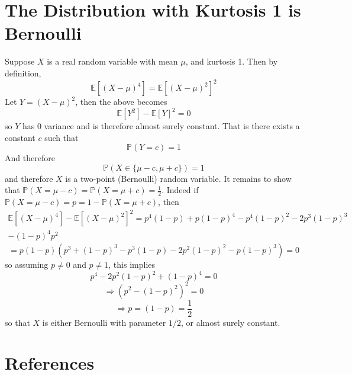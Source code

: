 \documentclass{article}
\newcommand{\prob}[1]{\mathbb{P}\left(#1\right)}
\begin{document}
\section{The Distribution with Kurtosis 1 is Bernoulli}
\label{sec:bernoulli}
Suppose $X$ is a real random variable with mean $\mu$, and kurtosis 1. Then by definition,
\begin{equation}
    \mathbb{E}[(X-\mu)^4] = \mathbb{E}[(X-\mu)^2]^2
\end{equation}
Let $Y=(X-\mu)^2$, then the above becomes
\begin{equation}
    \mathbb{E}[Y^2]-\mathbb{E}[Y]^2 = 0
\end{equation}
so $Y$ has 0 variance and is therefore almost surely constant. That is there exists a constant $c$ such that
\begin{equation}
    \prob{Y=c} = 1
\end{equation}
And therefore
\begin{equation}
    \prob{X \in \{\mu-c, \mu+c\}} = 1
\end{equation}
and therefore $X$ is a two-point (Bernoulli) random variable. It remains to show that $\prob{X = \mu-c} = \prob{X = \mu + c} = \frac{1}{2}$. Indeed if $\prob{X = \mu-c} = p = 1 - \prob{X=\mu+c}$, then
\begin{gather}
    \mathbb{E}[(X-\mu)^4] - \mathbb{E}[(X-\mu)^2]^2 = p^4(1-p) + p(1-p)^4 - p^4(1-p)^2 - 2p^3(1-p)^3 \nonumber\\ 
- (1-p)^4p^2
\end{gather}
\begin{equation}
    = p(1-p)(p^3 + (1-p)^3 - p^3(1-p) - 2p^2(1-p)^2 - p(1-p)^3) = 0
\end{equation}
so assuming $p \neq 0$ and $p \neq 1$, this implies
\begin{equation}
    p^4 - 2p^2(1-p)^2 + (1-p)^4 = 0
\end{equation}
\begin{equation}
    \Rightarrow (p^2-(1-p)^2)^2 = 0
\end{equation}
\begin{equation}
    \Rightarrow p = (1-p) = \frac{1}{2}
\end{equation}
so that $X$ is either Bernoulli with parameter $1/2$, or almost surely constant.




\section*{References}
\end{document}
